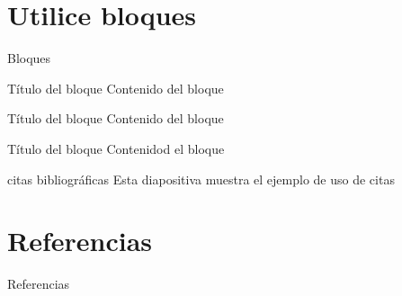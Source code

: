 \documentclass[compress,xcolor=table]{beamer}
\begin{document}
\section{Utilice bloques}

\begin{frame}[fragile]{Bloques}
	
	\begin{block}{Título del bloque}
		Contenido del bloque
	\end{block}
	
	\begin{exampleblock}{Título del bloque} 
		Contenido del bloque
	\end{exampleblock}
	
	\begin{alertblock}{Título del bloque}
		Contenidod el bloque
	\end{alertblock}
\end{frame}

\begin{frame}{citas bibliográficas}
	Esta diapositiva muestra el ejemplo de uso de citas \cite{Leithold}
\end{frame}

\section{Referencias}

\begin{frame}[allowframebreaks]{Referencias}
	\printbibliography%
\end{frame}
\end{document}
